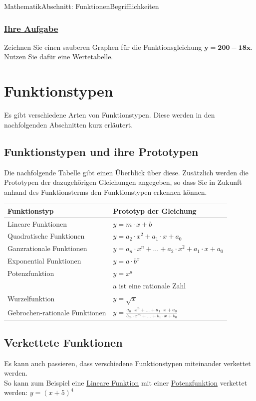 \documentclass[11pt,twocolumn,oneside,openany,headings=optiontotoc,11pt,numbers=noenddot]{article}
\begin{document}
\begin{worksheet}{Mathematik}{Abschnitt: Funktionen}{Begrifflichkeiten}
		\subsubsection*{\underline{Ihre Aufgabe}}
		Zeichnen Sie einen sauberen Graphen für die Funktionsgleichung \(\mathbf{y = 200-18x}\).\\
		Nutzen Sie dafür eine Wertetabelle.
		\newpage
		\section{Funktionstypen}
		Es gibt verschiedene Arten von Funktionstypen. Diese werden in den nachfolgenden Abschnitten kurz erläutert.
		\subsection{Funktionstypen und ihre Prototypen}
		Die nachfolgende Tabelle gibt einen Überblick über diese. Zusätzlich werden die Prototypen der dazugehörigen Gleichungen angegeben, so dass Sie in Zukunft anhand des Funktionsterms den Funktionstypen erkennen können.\\
		\par\bigskip\noindent
		\begin{tabularx}{0.5\textwidth}{|X|X|}
			\hline
			\textbf{Funktionstyp} & \textbf{Prototyp der Gleichung}\\
			\hline
			Lineare Funktionen & \(y = m\cdot{}x + b\)\\
			\hline
			Quadratische Funktionen & \(y = a_2\cdot{}x^2 + a_1\cdot{}x + a_0\)\\
			\hline
			Ganzrationale Funktionen & \(y = a_n\cdot{}x^n + \ldots{} + a_2\cdot{}x^2 + a_1\cdot{}x + a_0\)\\
			\hline
			Exponential Funktionen & \(y = a\cdot{} b^x\)\\
			\hline
			Potenzfunktion & \(y = x^a\)\\
			& a ist eine rationale Zahl\\
			\hline
			Wurzelfunktion & \(y = \sqrt{x}\)\\
			\hline
			Gebrochen-rationale Funktionen & \(y = \frac{a_n\cdot{}x^n + \ldots{} + a_1\cdot{}x + a_0}{b_m\cdot{}x^m + \ldots{} + b_1\cdot{}x + b_0}\)\\
			\hline
		\end{tabularx}
		\subsection{Verkettete Funktionen}
		Es kann auch passieren, dass verschiedene Funktionstypen miteinander verkettet werden.\\
		So kann zum Beispiel eine \underline{Lineare Funktion} mit einer \underline{Potenzfunktion} verkettet werden: \(y = (x +5)^4\)
	\end{worksheet}
\end{document}
